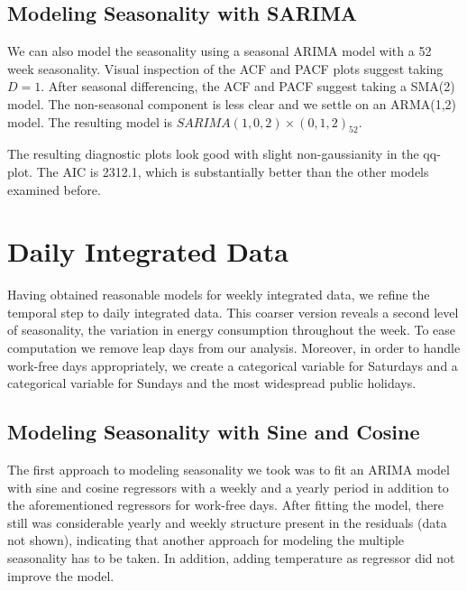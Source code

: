 \documentclass[conference]{IEEEtran}
\begin{document}
\subsection{Modeling Seasonality with SARIMA}
We can also model the seasonality using a seasonal ARIMA model with a 52 week seasonality. Visual inspection of the ACF and PACF plots suggest taking $D=1$. After seasonal differencing, the ACF and PACF suggest taking a SMA(2) model. The non-seasonal component is less clear and we settle on an ARMA(1,2) model. The resulting model is $SARIMA(1,0,2)\times(0,1,2)_{52}$. 
\par
The resulting diagnostic plots look good with slight non-gaussianity in the qq-plot. The AIC is 2312.1, which is substantially better than the other models examined before.

\section{Daily Integrated Data}
Having obtained reasonable models for weekly integrated data, we refine the temporal step to daily integrated data. This coarser version reveals a second level of seasonality, the variation in energy consumption throughout the week. To ease computation we remove leap days from our analysis. Moreover, in order to handle work-free days appropriately, we create a categorical variable for Saturdays and a categorical variable for Sundays and the most widespread public holidays. 

\subsection{Modeling Seasonality with Sine and Cosine}
The first approach to modeling seasonality we took was to fit an ARIMA model with sine and cosine regressors with a weekly and a yearly period in addition to the aforementioned regressors for work-free days. After fitting the model, there still was considerable yearly and weekly structure present in the residuals (data not shown), indicating that another approach for modeling the multiple seasonality has to be taken. In addition, adding temperature as regressor did not improve the model. 
\end{document}
